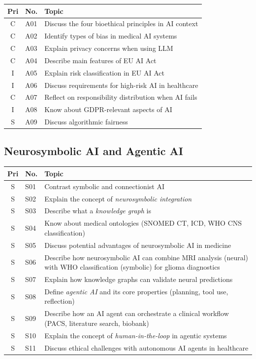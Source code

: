 \documentclass[11pt,a4paper]{article}
\begin{document}
\begin{longtable}{@{}clp{9cm}@{}}
\toprule
\textbf{Pri} & \textbf{No.} & \textbf{Topic} \\
\midrule
\endfirsthead
\midrule
\endhead
\midrule
\endfoot
\bottomrule
\endlastfoot
C & A01 & Discuss the four bioethical principles in AI context \\
C & A02 & Identify types of bias in medical AI systems \\
C & A03 & Explain privacy concerns when using LLM \\
C & A04 & Describe main features of EU AI Act \\
I & A05 & Explain risk classification in EU AI Act \\
I & A06 & Discuss requirements for high-risk AI in healthcare \\
C & A07 & Reflect on responsibility distribution when AI fails \\
I & A08 & Know about GDPR-relevant aspects of AI \\
S & A09 & Discuss algorithmic fairness \\
\end{longtable}

\subsection{Neurosymbolic AI and Agentic AI}

\begin{longtable}{@{}clp{9cm}@{}}
\toprule
\textbf{Pri} & \textbf{No.} & \textbf{Topic} \\
\midrule
\endfirsthead
\midrule
\endhead
\midrule
\endfoot
\bottomrule
\endlastfoot
S & S01 & Contrast symbolic and connectionist AI \\
S & S02 & Explain the concept of \emph{neurosymbolic integration} \\
S & S03 & Describe what a \emph{knowledge graph} is \\
S & S04 & Know about medical ontologies (SNOMED CT, ICD, WHO CNS classification) \\
S & S05 & Discuss potential advantages of neurosymbolic AI in medicine \\
S & S06 & Describe how neurosymbolic AI can combine MRI analysis (neural) with WHO classification (symbolic) for glioma diagnostics \\
S & S07 & Explain how knowledge graphs can validate neural predictions \\
S & S08 & Define \emph{agentic AI} and its core properties (planning, tool use, reflection) \\
S & S09 & Describe how an AI agent can orchestrate a clinical workflow (PACS, literature search, biobank) \\
S & S10 & Explain the concept of \emph{human-in-the-loop} in agentic systems \\
S & S11 & Discuss ethical challenges with autonomous AI agents in healthcare \\
\end{longtable}
\end{document}
